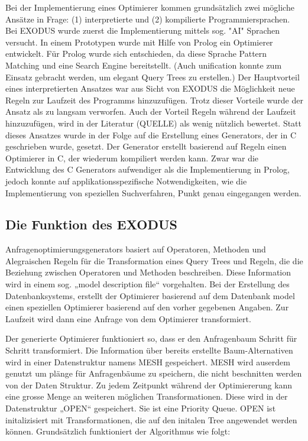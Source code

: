 Bei der Implementierung eines Optimierer kommen grundsätzlich zwei mögliche Ansätze in Frage: (1) interpretierte und (2) kompilierte Programmiersprachen. Bei EXODUS wurde zuerst die Implementierung mittels sog. "AI" Sprachen versucht. In einem Prototypen wurde mit Hilfe von Prolog ein Optimierer entwickelt. Für Prolog wurde sich entschieden, da diese Sprache Pattern Matching und eine Search Engine bereitstellt. (Auch unification konnte zum Einsatz gebracht werden, um elegant Query Trees zu erstellen.) Der Hauptvorteil eines interpretierten Ansatzes war aus Sicht von EXODUS die Möglichkeit neue Regeln zur Laufzeit des Programms hinzuzufügen. Trotz dieser Vorteile wurde der Ansatz als zu langsam verworfen. Auch der Vorteil Regeln während der Laufzeit hinzuzufügen, wird in der Literatur (QUELLE) als wenig nützlich bewertet. Statt dieses Ansatzes wurde in der Folge auf die Erstellung eines Generators, der in C geschrieben wurde, gesetzt. Der Generator erstellt basierend auf Regeln einen Optimierer in C, der wiederum kompiliert werden kann. Zwar war die Entwicklung des C Generators aufwendiger als die Implementierung in Prolog, jedoch konnte auf applikationsspezifische Notwendigkeiten, wie die Implementierung von speziellen Suchverfahren, Punkt genau eingegangen werden.

\subsection{Die Funktion des EXODUS} Anfragenoptimierungsgenerators basiert auf Operatoren, Methoden und Alegraischen Regeln für die Transformation eines Query Trees und Regeln, die die Beziehung zwischen Operatoren und Methoden beschreiben. Diese Information wird in einem sog. „model description file“ vorgehalten. Bei der Erstellung des Datenbanksystems, erstellt der Optimierer basierend auf dem Datenbank model einen speziellen Optimierer basierend auf den vorher gegebenen Angaben. Zur Laufzeit wird dann eine Anfrage von dem Optimierer transformiert.

Der generierte Optimierer funktioniert so, dass er den Anfragenbaum Schritt für Schritt transformiert. Die Information über bereits erstellte Baum-Alternativen wird in einer Datenstruktur namens MESH gespeichert. MESH wird auserdem genutzt um plänge für Anfragenbäume zu speichern, die nicht beschnitten werden von der Daten Struktur. Zu jedem Zeitpunkt während der Optimiererung kann eine grosse Menge an weiteren möglichen Transformationen. Diese wird in der Datenstruktur „OPEN“ gespeichert. Sie ist eine Priority Queue. OPEN ist initalizisiert mit Transformationen, die auf den initalen Tree angewendet werden können. Grundsätzlich funktioniert der Algorithmus wie folgt:

